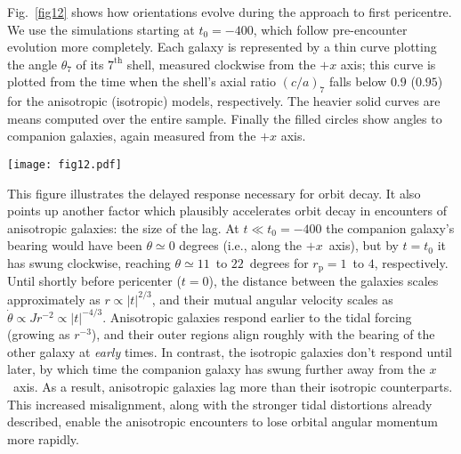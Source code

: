 \documentclass[fleqn,usenatbib]{mnras}
\begin{document}
Fig.~\ref{fig12} shows how orientations evolve during the approach to first pericentre.  We use the simulations starting at $t_{0} = -400$, which follow pre-encounter evolution more completely. Each galaxy is represented by a thin curve plotting the angle $\theta_7$ of its $7^\mathrm{th}$ shell, measured clockwise from the $+x$ axis; this curve is plotted from the time when the shell's axial ratio $(c/a)_{7}$ falls below $0.9$ ($0.95$) for the anisotropic (isotropic) models, respectively. The heavier solid curves are means computed over the entire sample. Finally the filled circles show angles to companion galaxies, again measured from the $+x$ axis.

\begin{figure*}
    \centering
    \texttt{[image: fig12.pdf]}
    \caption{Orientation of tidal distortions vs.~time.  $\theta_{7}$ is the angle of the major axis of the $7^\mathrm{th}$ shell, measured clockwise from the $+x$ axis. Red and grey show results for $r_\mathrm{a} = 1.297$ and~$\infty$, respectively. Thin solid lines are individual realizations, while heavy solid lines are sample means. Small filled circles with alternating colors show the bearing of the companion galaxy.
    \label{fig12}}
\end{figure*}

This figure illustrates the delayed response necessary for orbit decay. It also points up another factor which plausibly accelerates orbit decay in encounters of anisotropic galaxies: the size of the lag. At $t \ll t_{0} = -400$ the companion galaxy's bearing would have been $\theta \simeq 0$ degrees (i.e., along the $+x$~axis), but by $t = t_{0}$ it has swung clockwise, reaching $\theta \simeq 11$~to $22$~degrees for $r_\mathrm{p} = 1$~to $4$, respectively. Until shortly before pericenter ($t = 0$), the distance between the galaxies scales approximately as $r \propto |t|^{2/3}$, and their mutual angular velocity scales as $\dot{\theta} \propto J r^{-2} \propto |t|^{-4/3}$. Anisotropic galaxies respond earlier to the tidal forcing (growing as $r^{-3}$), and their outer regions align roughly with the bearing of the other galaxy at \textit{early} times. In contrast, the isotropic galaxies don't respond until later, by which time the companion galaxy has swung further away from the $x$~axis. As a result, anisotropic galaxies lag more than their isotropic counterparts. This increased misalignment, along with the stronger tidal distortions already described, enable the anisotropic encounters to lose orbital angular momentum more rapidly.
\end{document}
